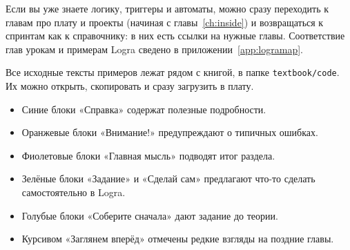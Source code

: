 Если вы уже знаете логику, триггеры и автоматы, можно сразу переходить к главам
про плату и проекты (начиная с главы~\ref{ch:inside}) и возвращаться к
спринтам как к справочнику: в них есть ссылки на нужные главы. Соответствие глав урокам и примерам Logra
сведено в приложении~\ref{app:logramap}.

Все исходные тексты примеров лежат рядом с книгой, в папке
\nolinkurl{textbook/code}. Их можно открыть, скопировать и
сразу загрузить в плату.

\begin{infobox}[Обозначения]
\begin{itemize}
  \item Синие блоки «Справка» содержат полезные подробности.
  \item Оранжевые блоки «Внимание!» предупреждают о типичных ошибках.
  \item Фиолетовые блоки «Главная мысль» подводят итог раздела.
  \item Зелёные блоки «Задание» и «Сделай сам» предлагают что-то сделать
    самостоятельно в Logra.
  \item Голубые блоки «Соберите сначала» дают задание до теории.
  \item Курсивом «Заглянем вперёд» отмечены редкие взгляды на поздние главы.
\end{itemize}
\end{infobox}

